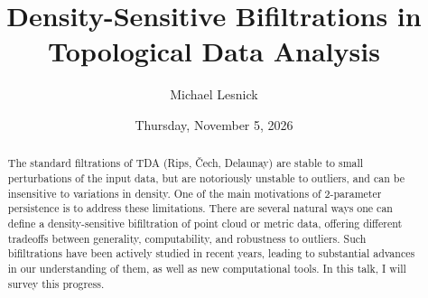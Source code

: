 \documentclass{UAmathtalk}
\author{Michael Lesnick}
\title{Density-Sensitive Bifiltrations in Topological Data Analysis}
\date{Thursday, November 5, 2026}
\begin{document}
\maketitle

\begin{abstract}
The standard filtrations of TDA (Rips, Čech, Delaunay) are stable to small perturbations of the input data, but are notoriously unstable to outliers, and can be insensitive to variations in density. One of the main motivations of 2-parameter persistence is to address these limitations. There are several natural ways one can define a density-sensitive bifiltration of point cloud or metric data, offering different tradeoffs between generality, computability, and robustness to outliers. Such bifiltrations have been actively studied in recent years, leading to substantial advances in our understanding of them, as well as new computational tools. In this talk, I will survey this progress.
\end{abstract}
\end{document}
